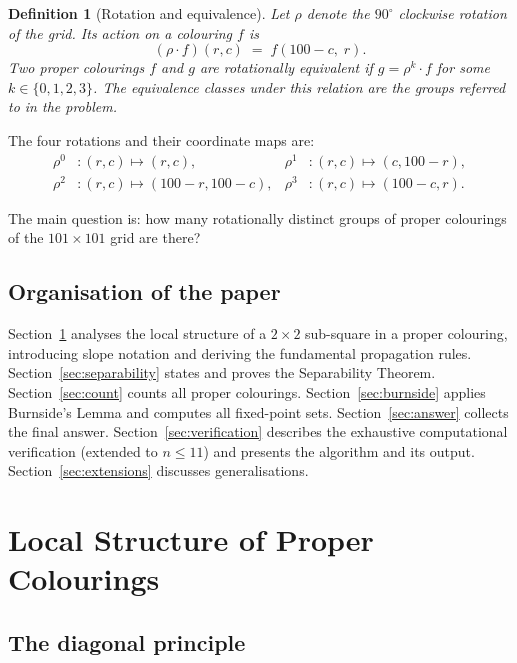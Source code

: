 \documentclass{article}
\newtheorem{definition}[theorem]{Definition}
\begin{document}
\begin{definition}[Rotation and equivalence]
Let $\rho$ denote the $90^\circ$ clockwise rotation of the
grid.  Its action on a colouring $f$ is
\[
  (\rho\cdot f)(r,c) \;=\; f(100-c,\;r).
\]
Two proper colourings $f$ and $g$ are \emph{rotationally
equivalent} if $g = \rho^k\cdot f$ for some
$k\in\{0,1,2,3\}$.  The equivalence classes under this
relation are the \emph{groups} referred to in the problem.
\end{definition}

The four rotations and their coordinate maps are:
\begin{align*}
  \rho^0&: (r,c)\mapsto(r,c),
  &
  \rho^1&: (r,c)\mapsto(c,100-r), \\
  \rho^2&: (r,c)\mapsto(100-r,100-c),
  &
  \rho^3&: (r,c)\mapsto(100-c,r).
\end{align*}

The main question is: how many rotationally distinct groups of
proper colourings of the $101\times 101$ grid are there?

\subsection{Organisation of the paper}

Section~\ref{sec:local} analyses the local structure of a
$2\times 2$ sub-square in a proper colouring, introducing
slope notation and deriving the fundamental propagation rules.
Section~\ref{sec:separability} states and proves the
Separability Theorem.  Section~\ref{sec:count} counts all
proper colourings.  Section~\ref{sec:burnside} applies
Burnside's Lemma and computes all fixed-point sets.
Section~\ref{sec:answer} collects the final answer.
Section~\ref{sec:verification} describes the exhaustive
computational verification (extended to $n \le 11$) and
presents the algorithm and its output.
Section~\ref{sec:extensions} discusses generalisations.

\section{Local Structure of Proper Colourings}
\label{sec:local}

\subsection{The diagonal principle}
\end{document}
